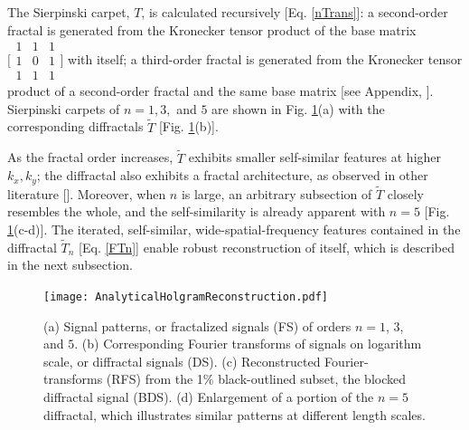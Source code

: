 The Sierpinski carpet, $T$, is calculated recursively [Eq. \ref{nTrans}]: a second-order fractal is generated from the Kronecker tensor product of the base matrix $\Big[\begin{smallmatrix} 1 & 1 & 1 \\ 1 & 0 & 1\\ 1 & 1 & 1\end{smallmatrix}\Big]$ with itself; a third-order fractal is generated from the Kronecker tensor product of a second-order fractal and the same base matrix [see Appendix, \cite{Code1}]. Sierpinski carpets of $n= 1, 3,$ and $5$ are shown in Fig. \ref{AnalRecon}(a) with the corresponding diffractals $\tilde{T}$ [Fig. \ref{AnalRecon}(b)]. 


As the fractal order increases, $\tilde{T}$ exhibits smaller self-similar features at higher $k_x,k_y$;  the diffractal also exhibits a fractal architecture, as observed in other literature [\cite{Berry,Horvath}].  Moreover, when $n$ is large, an arbitrary subsection of $\tilde{T}$ closely resembles the whole, and the self-similarity is already apparent with $n= 5$ [Fig. \ref{AnalRecon}(c-d)]. The iterated, self-similar, wide-spatial-frequency features contained in the diffractal $\tilde{T}_n$ [Eq. \ref{FTn}] enable robust reconstruction of itself, which is described in the next subsection.

\begin{figure}[t!]
 \texttt{[image: AnalyticalHolgramReconstruction.pdf]}
\caption{(a) Signal patterns, or fractalized signals (FS) of orders $n = 1$, $3$, and $5$. (b) Corresponding Fourier transforms of signals on logarithm scale, or diffractal signals (DS). (c) Reconstructed Fourier-transforms (RFS) from the 1\% black-outlined subset, the blocked diffractal signal (BDS). (d) Enlargement of a portion of the $n=5$ diffractal, which illustrates similar patterns at different length scales.}
\label{AnalRecon}
\end{figure}


